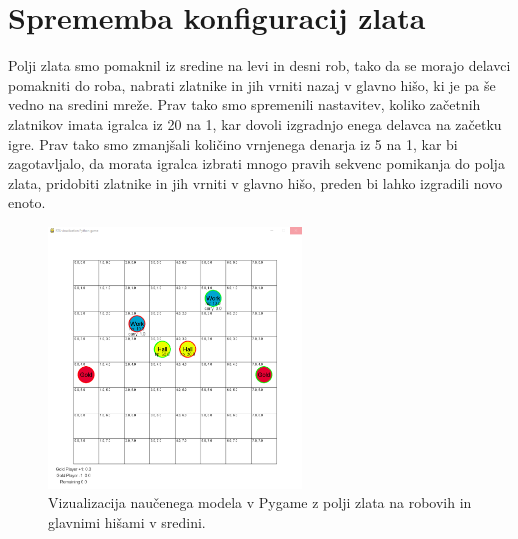 \documentclass[a4paper, 12pt]{book}
\begin{document}
\section{Sprememba konfiguracij zlata}
\label{resultThird}

Polji zlata smo pomaknil iz sredine na levi in desni rob, tako da se morajo delavci pomakniti do roba, nabrati zlatnike in jih vrniti nazaj v glavno hišo, ki je pa še vedno na sredini mreže.
Prav tako smo spremenili nastavitev, koliko začetnih zlatnikov imata igralca iz 20 na 1, kar dovoli izgradnjo enega delavca na začetku igre.
Prav tako smo zmanjšali količino vrnjenega denarja iz 5 na 1, kar bi zagotavljalo, da morata igralca izbrati mnogo pravih sekvenc pomikanja do polja zlata, pridobiti zlatnike in jih vrniti v glavno hišo, preden bi lahko izgradili novo enoto.

\begin{figure}[h]
	\begin{center}
		\includegraphics[width=0.6\textwidth]{third-2018-11-14.pdf}
	\end{center}
	\caption{Vizualizacija naučenega modela v Pygame z polji zlata na robovih in glavnimi hišami v sredini.}
	\label{vizualizacijaRezultatovSpremembaZlata}
\end{figure}
\end{document}
